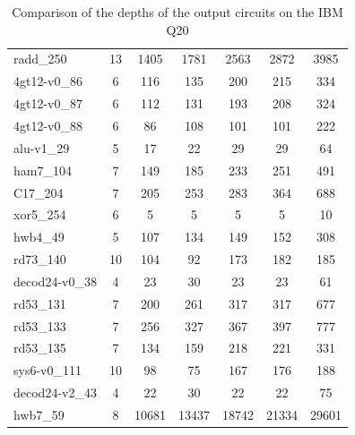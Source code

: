 \documentclass[runningheads]{llncs}
\begin{document}
\begin{table}[!ht]
\begin{center}
\begin{tabular}{|p{4.3cm}<{\centering}|c|c|c|c|c|c|}
radd\_250 & 13 & 1405 & 1781 & 2563 & 2872 & 3985 \\
4gt12-v0\_86 & 6 & 116 & 135 & 200 & 215 & 334 \\
4gt12-v0\_87 & 6 & 112 & 131 & 193 & 208 & 324 \\
4gt12-v0\_88 & 6 & 86 & 108 & 101 & 101 & 222 \\
alu-v1\_29 & 5 & 17 & 22 & 29 & 29 & 64 \\
ham7\_104 & 7 & 149 & 185 & 233 & 251 & 491 \\
C17\_204 & 7 & 205 & 253 & 283 & 364 & 688 \\
xor5\_254 & 6 & 5 & 5 & 5 & 5 & 10 \\
hwb4\_49 & 5 & 107 & 134 & 149 & 152 & 308 \\
rd73\_140 & 10 & 104 & 92 & 173 & 182 & 185 \\
decod24-v0\_38 & 4 & 23 & 30 & 23 & 23 & 61 \\
rd53\_131 & 7 & 200 & 261 & 317 & 317 & 677 \\
rd53\_133 & 7 & 256 & 327 & 367 & 397 & 777 \\
rd53\_135 & 7 & 134 & 159 & 218 & 221 & 331 \\
sys6-v0\_111 & 10 & 98 & 75 & 167 & 176 & 188 \\
decod24-v2\_43 & 4 & 22 & 30 & 22 & 22 & 75 \\
hwb7\_59 & 8 & 10681 & 13437 & 18742 & 21334 & 29601 \\
					\hline
						\end{tabular} 
						\end{center} 	
						\caption{Comparison of  the depths of the output circuits on the IBM Q20} 
						\label{tab7}
					\end{table}
\end{document}
